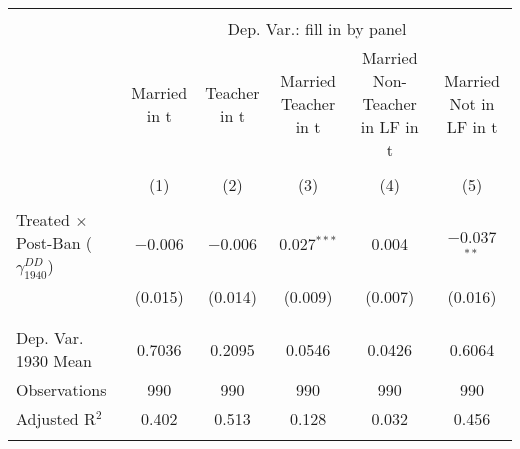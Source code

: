 
\begin{tabular}{@{\extracolsep{5pt}}lccccc} 
\\[-1.8ex]\hline 
\hline \\[-1.8ex] 
 & \multicolumn{5}{c}{Dep. Var.: fill in by panel} \\ 
\cline{2-6} 
 & Married in t & Teacher in t & Married Teacher in t & Married Non-Teacher in LF in t & Married Not in LF in t \\ 
\\[-1.8ex] & (1) & (2) & (3) & (4) & (5)\\ 
\hline \\[-1.8ex] 
 Treated $\times$ Post-Ban ($\gamma_{1940}^{DD}$) & $-$0.006 & $-$0.006 & 0.027$^{***}$ & 0.004 & $-$0.037$^{**}$ \\ 
  & (0.015) & (0.014) & (0.009) & (0.007) & (0.016) \\ 
  & & & & & \\ 
\hline \\[-1.8ex] 
Dep. Var. 1930 Mean & 0.7036 & 0.2095 & 0.0546 & 0.0426 & 0.6064 \\ 
Observations & 990 & 990 & 990 & 990 & 990 \\ 
Adjusted R$^{2}$ & 0.402 & 0.513 & 0.128 & 0.032 & 0.456 \\ 
\hline 
\hline \\[-1.8ex] 
\end{tabular} 
